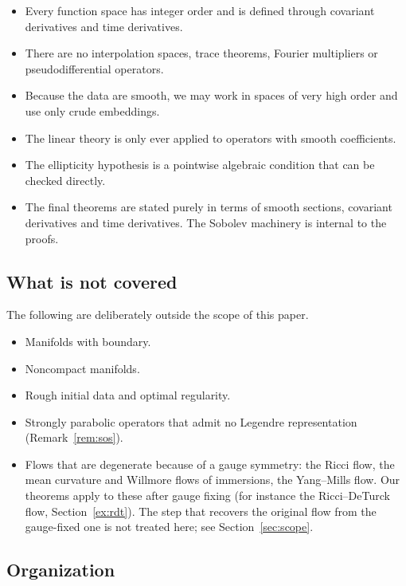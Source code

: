 \documentclass[11pt,reqno]{amsart}
\theoremstyle{definition}
\theoremstyle{remark}
\numberwithin{equation}{section}
\begin{document}
\begin{itemize}[nosep]
\item Every function space has integer order and is defined through covariant derivatives and time
  derivatives.
\item There are no interpolation spaces, trace theorems, Fourier multipliers or pseudodifferential
  operators.
\item Because the data are smooth, we may work in spaces of very high order and use only crude
  embeddings.
\item The linear theory is only ever applied to operators with smooth coefficients.
\item The ellipticity hypothesis is a pointwise algebraic condition that can be checked directly.
\item The final theorems are stated purely in terms of smooth sections, covariant derivatives and
  time derivatives. The Sobolev machinery is internal to the proofs.
\end{itemize}

\subsection{What is not covered}

The following are deliberately outside the scope of this paper.
\begin{itemize}[nosep]
\item Manifolds with boundary.
\item Noncompact manifolds.
\item Rough initial data and optimal regularity.
\item Strongly parabolic operators that admit no Legendre representation (Remark~\ref{rem:sos}).
\item Flows that are degenerate because of a gauge symmetry: the Ricci flow, the mean curvature and
  Willmore flows of immersions, the Yang--Mills flow. Our theorems apply to these after gauge fixing
  (for instance the Ricci--DeTurck flow, Section~\ref{ex:rdt}). The step that recovers the original
  flow from the gauge-fixed one is not treated here; see Section~\ref{sec:scope}.
\end{itemize}

\subsection{Organization}
\end{document}
